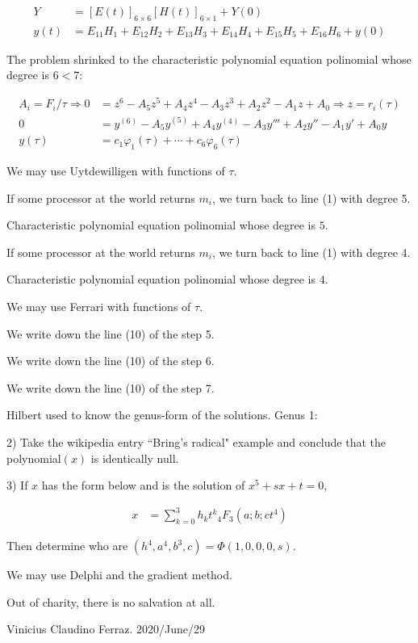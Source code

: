 \documentclass[12pt]{article}
\begin{document}
\begin{align}
Y &= [E(t)]_{6 \times 6} [H(t)]_{6 \times 1} + Y(0) \\
y(t) &= E_{11} H_1 + E_{12} H_2 + E_{13} H_3 + E_{14} H_4 + E_{15} H_5 + E_{16} H_6 + y(0)
\end{align}

The problem shrinked to the characteristic polynomial equation polinomial whose degree is $6 < 7$:

\begin{align}
A_i = F_i/\tau \Rightarrow 0 &= z^6 - A_5 z^5 + A_4 z^4 - A_3 z^3 + A_2 z^2 - A_1 z + A_0 \Rightarrow z = r_i(\tau) \\
0 &= y^{(6)} - A_5 y^{(5)} + A_4 y^{(4)} - A_3 y''' + A_2 y'' - A_1 y' + A_0 y \\
y(\tau) &= c_1 \varphi_1(\tau) + \cdots + c_6 \varphi_6(\tau)
\end{align}

We may use Uytdewilligen with functions of $\tau$.

If some processor at the world returns $m_i$, we turn back to line (1) with degree 5.

Characteristic polynomial equation polinomial whose degree is $5$.

If some processor at the world returns $m_i$, we turn back to line (1) with degree 4.

Characteristic polynomial equation polinomial whose degree is $4$.

We may use Ferrari with functions of $\tau$.

We write down the line (10) of the step 5.

We write down the line (10) of the step 6.

We write down the line (10) of the step 7.

\vspace{3mm}

Hilbert used to know the genus-form of the solutions. Genus 1:

\vspace{3mm}

2) Take the wikipedia entry ``Bring's radical" example and conclude that the polynomial$(x)$ is identically null.

\vspace{3mm}

3) If $x$ has the form below and is the solution of $x^5 + sx + t = 0$,

\begin{align}
x &= \sum_{k = 0}^3 h_k t^k {}_4F_3(a; b; ct^4)
\end{align}

Then determine who are $(h^4, a^4, b^3, c) = \Phi(1, 0, 0, 0, s)$. 

We may use Delphi and the gradient method.

\vspace{6mm}

Out of charity, there is no salvation at all.

Vinicius Claudino Ferraz. 2020/June/29
\end{document}
